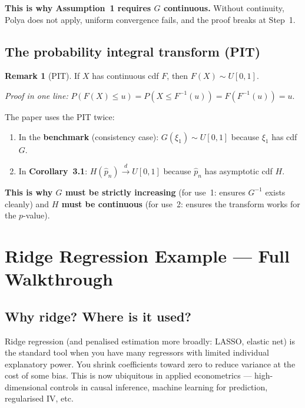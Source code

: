 \documentclass[11pt]{article}
\theoremstyle{definition}
\newtheorem*{remark}{Remark}
\begin{document}
\textbf{This is why Assumption~1 requires $G$ continuous.}
Without continuity, Polya does not apply, uniform convergence fails,
and the proof breaks at Step~1.
 
\subsection{The probability integral transform (PIT)}
 
\begin{remark}[PIT]
  If $X$ has continuous cdf $F$, then $F(X) \sim U[0,1]$.
\end{remark}
 
\textit{Proof in one line:}
$P(F(X) \le u) = P(X \le F^{-1}(u)) = F(F^{-1}(u)) = u$.
 
\medskip
 
The paper uses the PIT twice:
\begin{enumerate}[label=(\arabic*)]
  \item In the \textbf{benchmark} (consistency case):
    $G(\xi_1) \sim U[0,1]$ because $\xi_1$ has cdf $G$.
  \item In \textbf{Corollary~3.1}:
    $H(\hat p_n) \xrightarrow{d} U[0,1]$ because $\hat p_n$ has
    asymptotic cdf $H$.
\end{enumerate}
 
\textbf{This is why $G$ must be strictly increasing} (for use~1: ensures
$G^{-1}$ exists cleanly) and \textbf{$H$ must be continuous} (for use~2:
ensures the transform works for the $p$-value).
 
\section{Ridge Regression Example --- Full Walkthrough}
 
\subsection{Why ridge? Where is it used?}
 
Ridge regression (and penalised estimation more broadly: LASSO, elastic
net) is the standard tool when you have many regressors with limited
individual explanatory power. You shrink coefficients toward zero to
reduce variance at the cost of some bias. This is now ubiquitous in
applied econometrics --- high-dimensional controls in causal inference,
machine learning for prediction, regularised IV, etc.
 
\end{document}
